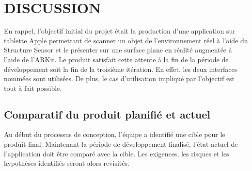\documentclass[rapport.tex]{subfiles}
\begin{document}
\chapter*{\uppercase{Discussion}}
En rappel, l’objectif initial du projet était la production d’une application sur tablette Apple permettant de scanner un objet de l’environnement réel à l’aide du Structure Sensor et le présenter sur une surface plane en réalité augmentée à l’aide de l’ARKit. Le produit satisfait cette attente à la fin de la période de développement soit la fin de la troisième itération. En effet, les deux interfaces nommées sont utilisées. De plus, le cas d’utilisation impliqué par l’objectif est tout à fait possible.
\section*{Comparatif du produit planifié et actuel}
Au début du processus de conception, l’équipe a identifié une cible pour le produit final. Maintenant la période de développement finalisé, l’état actuel de l’application doit être comparé avec la cible. Les exigences, les risques et les hypothèses identifiés seront alors revisités.
\end{document}
